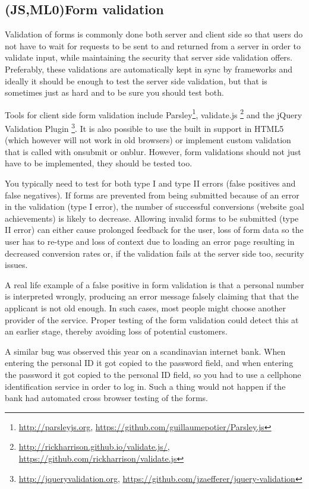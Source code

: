 \documentclass[11pt]{article}
\begin{document}
\subsection{(JS,ML0)Form validation}

Validation of forms is commonly done both server and client side so that users do not have to wait for requests to be sent to and returned from a server in order to validate input, while maintaining the security that server side validation offers. Preferably, these validations are automatically kept in sync by frameworks and ideally it should be enough to test the server side validation, but that is sometimes just as hard and to be sure you should test both.

Tools for client side form validation include Parsley\footnote{\url{http://parsleyjs.org}, \url{https://github.com/guillaumepotier/Parsley.js}}, validate.js \footnote{\url{http://rickharrison.github.io/validate.js/}, \url{https://github.com/rickharrison/validate.js}} and the jQuery Validation Plugin \footnote{\url{http://jqueryvalidation.org}, \url{https://github.com/jzaefferer/jquery-validation}}. It is also possible to use the built in support in HTML5 (which however will not work in old browsers) or implement custom validation that is called with onsubmit or onblur. However, form validations should not just have to be implemented, they should be tested too.

You typically need to test for both type I and type II errors (false positives and false negatives). If forms are prevented from being submitted because of an error in the validation (type I error), the number of successful conversions (website goal achievements) is likely to decrease. Allowing invalid forms to be submitted (type II error) can either cause prolonged feedback for the user, loss of form data so the user has to re-type and loss of context due to loading an error page resulting in decreased conversion rates or, if the validation fails at the server side too, security issues.

A real life example of a false positive in form validation is that a personal number is interpreted wrongly, producing an error message falsely claiming that that the applicant is not old enough. In such cases, most people might choose another provider of the service. Proper testing of the form validation could detect this at an earlier stage, thereby avoiding loss of potential customers. \cite{TwitterMe}

A similar bug was observed this year on a scandinavian internet bank. When entering the personal ID it got copied to the password field, and when entering the password it got copied to the personal ID field, so you had to use a cellphone identification service in order to log in. Such a thing would not happen if the bank had automated cross browser testing of the forms. \cite[question~38]{Ahnve}
\end{document}
